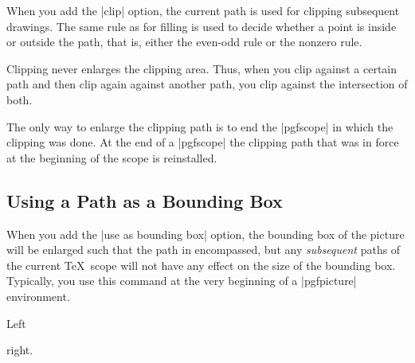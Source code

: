 When you add the |clip| option, the current path is used for
clipping subsequent drawings. The same rule as for filling is used to
decide whether a point is inside or outside the path, that is, either
the even-odd rule or the nonzero rule.

Clipping never enlarges the clipping area. Thus, when you clip against
a certain path and then clip again against another path, you clip
against the intersection of both.

The only way to enlarge the clipping path is to end the |{pgfscope}|
in which the clipping was done. At the end of a |{pgfscope}| the
clipping path that was in force at the beginning of the scope is
reinstalled. 

\subsection{Using a Path as a Bounding Box}
\label{section-using-bb}

When you add the |use as bounding box| option, the bounding box of the
picture will be enlarged such that the path in encompassed, but any
\emph{subsequent} paths of the current \TeX\ scope will not have any
effect on the size of the bounding box. Typically, you use this
command at the very beginning of a |{pgfpicture}| environment.

\begin{codeexample}[]
Left
\begin{pgfpicture}
  \pgfpathrectangle{\pgfpointorigin}{\pgfpoint{2ex}{1ex}}

  \pgfpathcircle{\pgfpointorigin}{2ex}
\end{pgfpicture}
right.
\end{codeexample}

